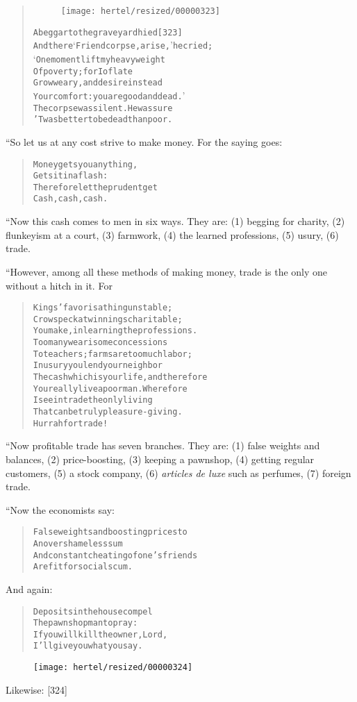 \documentclass[article, twoside, 10pt]{memoir}
\renewenvironment{verbatim}{%
\begin{quote}%
\vskip -10pt%
\begin{alltt}\normalfont\small}{\end{alltt}%
\end{quote}%
\vskip -10pt
} %
\begin{document}
\begin{verbatim}
\begin{figure}[p]\texttt{[image: hertel/resized/00000323]}\end{figure}A beggar to the graveyard hied                          [323]
And there ‘Friend corpse, arise,’ he cried;
‘One moment lift my heavy weight
Of poverty; for I of late
Grow weary, and desire instead
Your comfort: you are good and dead.’
The corpse was silent. He was sure
'Twas better to be dead than poor.
\end{verbatim}
“So let us at any cost strive to make money. For the saying goes:

\begin{verbatim}
Money gets you anything,
    Gets it in a flash:
Therefore let the prudent get
    Cash, cash, cash.
\end{verbatim}
“Now this cash comes to men in six ways. They are: (1) begging for
charity, (2) flunkeyism at a court, (3) farmwork, (4) the learned
professions, (5) usury, (6) trade.

“However, among all these methods of making money, trade is the
only one without a hitch in it. For

\begin{verbatim}
Kings' favor is a thing unstable;
Crows peck at winnings charitable;
You make, in learning the professions.
Too many wearisome concessions
To teachers; farms are too much labor;
In usury you lend your neighbor
The cash which is your life, and therefore
You really live a poor man. Wherefore
I see in trade the only living
That can be truly pleasure-giving.
Hurrah for trade!
\end{verbatim}
“Now profitable trade has seven branches. They are: (1) false
weights and balances, (2) price-boosting, (3) keeping a pawnshop,
(4) getting regular customers, (5) a stock company, (6)
\emph{articles de luxe} such as perfumes, (7) foreign trade.

“Now the economists say:

\begin{verbatim}
False weights and boosting prices to
    An overshameless sum
And constant cheating of one's friends
    Are fit for social scum.
\end{verbatim}
And again:

\begin{verbatim}
Deposits in the house compel
    The pawnshop man to pray:
If you will kill the owner, Lord,
    I'll give you what you say.
\end{verbatim}
\begin{figure}[p]\texttt{[image: hertel/resized/00000324]}\end{figure}Likewise: [324]
\end{document}
